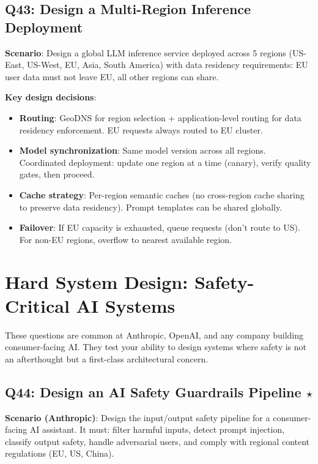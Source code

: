 \subsection{Q43: Design a Multi-Region Inference Deployment}

\textbf{Scenario}: Design a global LLM inference service deployed across 5 regions (US-East, US-West, EU, Asia, South America) with data residency requirements: EU user data must not leave EU, all other regions can share.

\textbf{Key design decisions}:
\begin{itemize}[leftmargin=*]
    \item \textbf{Routing}: GeoDNS for region selection + application-level routing for data residency enforcement. EU requests always routed to EU cluster.
    \item \textbf{Model synchronization}: Same model version across all regions. Coordinated deployment: update one region at a time (canary), verify quality gates, then proceed.
    \item \textbf{Cache strategy}: Per-region semantic caches (no cross-region cache sharing to preserve data residency). Prompt templates can be shared globally.
    \item \textbf{Failover}: If EU capacity is exhausted, queue requests (don't route to US). For non-EU regions, overflow to nearest available region.
\end{itemize}


\section{Hard System Design: Safety-Critical AI Systems}
\label{sec:hard-safety}

These questions are common at Anthropic, OpenAI, and any company building consumer-facing AI. They test your ability to design systems where safety is not an afterthought but a first-class architectural concern.

\subsection{Q44: Design an AI Safety Guardrails Pipeline $\star$}

\textbf{Scenario (Anthropic)}: Design the input/output safety pipeline for a consumer-facing AI assistant. It must: filter harmful inputs, detect prompt injection, classify output safety, handle adversarial users, and comply with regional content regulations (EU, US, China).

